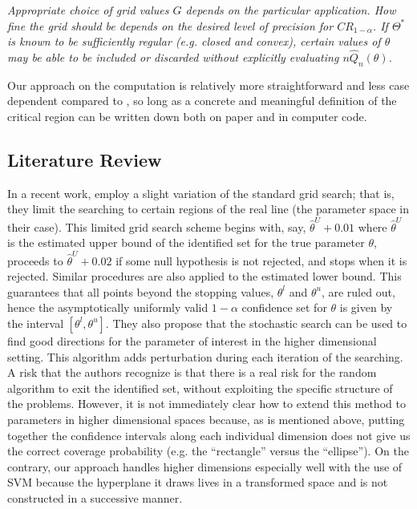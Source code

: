 \documentclass[12pt]{article}
\theoremstyle{definition}
\begin{document}
\begin{displayquote}
\textit{Appropriate choice of grid values $G$ depends on the particular application. How fine the grid should be depends on the desired level of precision for $C R_{1-\alpha}$. If $\Theta^{*}$ is known to be sufficiently regular (e.g. closed and convex), certain values of $\theta$ may be able to be included or discarded without explicitly evaluating $n \hat{Q}_{n}(\theta)$.}
\end{displayquote}
Our approach on the computation is relatively more straightforward and less case dependent compared to \cite{Rosen2008}, so long as a concrete and meaningful definition of the critical region can be written down both on paper and in computer code.

\subsection{Literature Review}
In a recent work, \cite{KKLS-2019} employ a slight variation of the standard grid search; that is, they limit the searching to certain regions of the real line (the parameter space in their case). This limited grid search scheme begins with, say, $\hat{\theta}^U+0.01$ where $\hat{\theta}^U$ is the estimated upper bound of the identified set for the true parameter $\theta$, proceeds to $\hat{\theta}^U+0.02$ if some null hypothesis is not rejected, and stops when it is rejected. Similar procedures are also applied to the estimated lower bound. This guarantees that all points beyond the stopping values, $\theta^l$ and $\theta^u$, are ruled out, hence the asymptotically uniformly valid $1-\alpha$ confidence set for $\theta$ is given by the interval $[\theta^l,\theta^u]$. They also propose that the stochastic search can be used to find good directions for the parameter of interest in the higher dimensional setting. This algorithm adds perturbation during each iteration of the searching. A risk that the authors recognize is that there is a real risk for the random algorithm to exit the identified set, without exploiting the specific structure of the problems. However, it is not immediately clear how to extend this method to parameters in higher dimensional spaces because, as is mentioned above, putting together the confidence intervals along each individual dimension does not give us the correct coverage probability (e.g. the ``rectangle'' versus the ``ellipse''). On the contrary, our approach handles higher dimensions especially well with the use of SVM because the hyperplane it draws lives in a transformed space and is not constructed in a successive manner.
\end{document}
